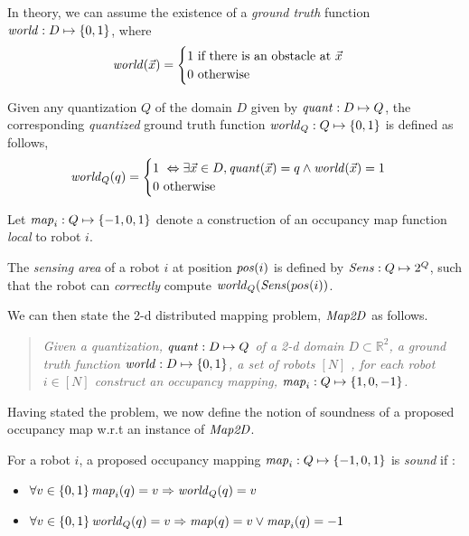 In theory, we can assume the existence of a \emph{ground truth} function $\mathit{world} : D\mapsto \left\{0,1\right\}$, where $$\mathit{world}(\Vec{x}) = \begin{cases}
1\ \mbox{if there is an obstacle at }\Vec{x}\\
0\ \mbox{otherwise}
\end{cases}
$$

Given any quantization $Q$ of the domain $D$ given by $\mathit{quant}:D\mapsto Q$, the corresponding \emph{quantized} ground truth function 
$\mathit{world}_Q : Q \mapsto \left\{0,1\right\}$ is defined as follows,  $$\mathit{world}_Q(q) = \begin{cases}
1\ \Leftrightarrow \exists \Vec{x}\in D, \mathit{quant}(\Vec{x}) = q \wedge \mathit{world}(\Vec{x}) = 1 \\
0\ \mbox{otherwise}
\end{cases}
$$

Let $\mathit{map}_i:Q\mapsto \left\{-1,0,1\right\}$ denote a construction of an occupancy map function \emph{local} to robot $i$.  %

\begin{definition} The \emph{sensing area} of a robot $i$ at position $\mathit{pos}(i)$ is defined by $\mathit{Sens}: Q \mapsto 2^{Q}$, such that the robot can \emph{correctly} compute $\mathit{world}_Q(\mathit{Sens}(pos(i))$.  
  \end{definition}


We can then state the 2-d distributed mapping problem, $\mathit{Map2D}$ as follows. \begin{quote}
 {\em Given a quantization, $\mathit{quant}:D\mapsto Q$ of a 2-d domain $D\subset \mathbb{R}^2$, a ground truth function $\mathit{world}:D \mapsto \left\{0,1\right\}$, a set of robots $[N]$ , for each robot $i \in [N]$ construct an occupancy mapping, $\mathit{map}_i: Q \mapsto \left\{1,0,-1\right\}$.
 }
\end{quote}


 Having stated the problem, we now define the notion of soundness of a proposed occupancy map w.r.t an instance of $\mathit{Map2D}$. 
\begin{definition}
\label{soundness}
 For a robot $i$, a proposed occupancy mapping $\mathit{map}_i: Q \mapsto \left\{-1,0,1\right\}$ is \emph{sound} if :
\begin{itemize}
\item $\forall v \in \left\{0,1\right\} \mathit{map}_i(q) = v \Rightarrow \mathit{world}_Q(q)  = v$
\item $\forall v \in \left\{0,1\right\}\mathit{world}_Q(q) = v \Rightarrow \mathit{map}(q) = v \vee \mathit{map}_i(q) = -1$
\end{itemize}
\end{definition}

